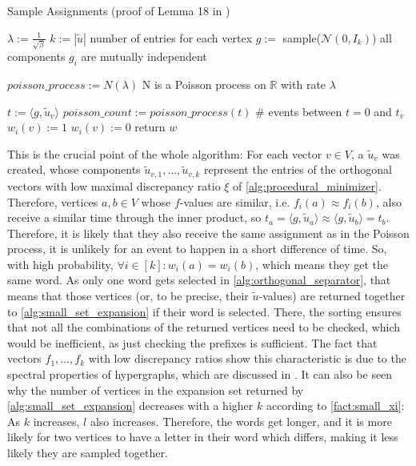 \begin{algorithm}[htpb]
	\caption{Sample Assignments (proof of Lemma 18 in \cite{LouisM14}) \label{alg:sample_assignments}} 
	\begin{algorithmic}
		\State $\lambda := \frac{1}{\sqrt{\beta}}$
		\State $k:= |\tilde{u}|$ \Comment number of entries for each vertex
		\State $g:=$ sample($\mathcal{N}(0,I_k)$) \Comment all components $g_i$ are mutually independent 
		
		\State $poisson\_process := N(\lambda)$ \Comment N is a Poisson process on $\mathbb{R}$ with rate $\lambda$
		
		
		
		\State $t := \langle g, \tilde{u}_v \rangle $
		\State $poisson\_count := poisson\_process(t)$ \Comment \# events between $t=0$ and $t_v$
		\State $w_i(v) := 1$
		\Else
		\State  $w_i(v) := 0$
		\EndIf
		\EndFor
		\EndFor
		\State return $w$
		\EndFunction %
	\end{algorithmic}
\end{algorithm}	


 
This is the crucial point of the whole algorithm: For each vector $v\in V$, a $\tilde{u}_v$ was created, whose components $\tilde{u}_{v,1} , \ldots, \tilde{u}_{v,k}$ represent the entries of the orthogonal vectors with low maximal discrepancy ratio $\xi$ of \cref{alg:procedural_minimizer}. Therefore, vertices $a,b\in V$ whose $f$-values are similar, i.e. $f_i(a)\approx f_i(b)$, also receive a similar time through the inner product, so $ t_a = \langle g, \tilde{u}_a \rangle \approx  \langle g, \tilde{u}_b \rangle =t_b $. Therefore, it is likely that they also receive the same assignment as in the Poisson process, it is unlikely for an event to happen in a short difference of time. So, with high probability, $\forall i\in [k]: w_i(a) = w_i(b)$, which means they get the same word. As only one word gets selected in \cref{alg:orthogonal_separator}, that means that those vertices (or, to be precise, their $\tilde{u}$-values) are returned together to \cref{alg:small_set_expansion} if their word is selected. There, the sorting ensures that not all the combinations of the returned vertices need to be checked, which would be inefficient, as just checking the prefixes is sufficient. The fact that vectors $f_1, \ldots, f_k$ with low discrepancy ratios show this characteristic is due to the spectral properties of hypergraphs, which are discussed in \cite{ChanLTZ16}.
It can also be seen why the number of vertices in the expansion set returned by \cref{alg:small_set_expansion} decreases with a higher $k$ according to \cref{fact:small_xi}: As $k$ increases, $l$ also increases. Therefore, the words get longer, and it is more likely for two vertices to have a letter in their word which differs, making it less likely they are sampled together.
	










